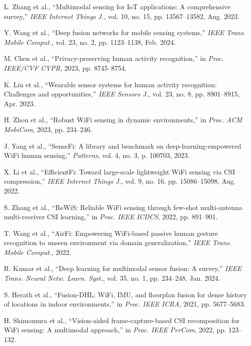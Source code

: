 \documentclass[journal]{IEEEtran}
\begin{document}
\begin{thebibliography}{99}

L. Zhang et al., ``Multimodal sensing for IoT applications: A comprehensive survey,'' \textit{IEEE Internet Things J.}, vol. 10, no. 15, pp. 13567--13582, Aug. 2023.

Y. Wang et al., ``Deep fusion networks for mobile sensing systems,'' \textit{IEEE Trans. Mobile Comput.}, vol. 23, no. 2, pp. 1123--1138, Feb. 2024.

M. Chen et al., ``Privacy-preserving human activity recognition,'' in \textit{Proc. IEEE/CVF CVPR}, 2023, pp. 8745--8754.

K. Liu et al., ``Wearable sensor systems for human activity recognition: Challenges and opportunities,'' \textit{IEEE Sensors J.}, vol. 23, no. 8, pp. 8901--8915, Apr. 2023.

H. Zhou et al., ``Robust WiFi sensing in dynamic environments,'' in \textit{Proc. ACM MobiCom}, 2023, pp. 234--246.

J. Yang et al., ``SenseFi: A library and benchmark on deep-learning-empowered WiFi human sensing,'' \textit{Patterns}, vol. 4, no. 3, p. 100703, 2023.

X. Li et al., ``EfficientFi: Toward large-scale lightweight WiFi sensing via CSI compression,'' \textit{IEEE Internet Things J.}, vol. 9, no. 16, pp. 15086--15098, Aug. 2022.

S. Zhang et al., ``ReWiS: Reliable WiFi sensing through few-shot multi-antenna multi-receiver CSI learning,'' in \textit{Proc. IEEE ICDCS}, 2022, pp. 891--901.

T. Wang et al., ``AirFi: Empowering WiFi-based passive human gesture recognition to unseen environment via domain generalization,'' \textit{IEEE Trans. Mobile Comput.}, 2022.

R. Kumar et al., ``Deep learning for multimodal sensor fusion: A survey,'' \textit{IEEE Trans. Neural Netw. Learn. Syst.}, vol. 35, no. 1, pp. 234--248, Jan. 2024.

S. Herath et al., ``Fusion-DHL: WiFi, IMU, and floorplan fusion for dense history of locations in indoor environments,'' in \textit{Proc. IEEE ICRA}, 2021, pp. 5677--5683.

H. Shimomura et al., ``Vision-aided frame-capture-based CSI recomposition for WiFi sensing: A multimodal approach,'' in \textit{Proc. IEEE PerCom}, 2022, pp. 123--132.


\end{thebibliography}
\end{document}
